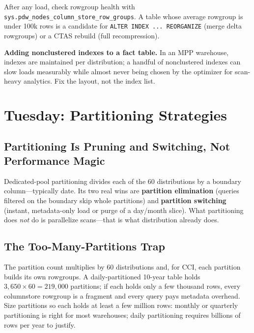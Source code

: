 \begin{tipbox}
After any load, check rowgroup health with \texttt{sys.pdw\_nodes\_column\_store\_row\_groups}. A table whose average rowgroup is under 100k rows is a candidate for \texttt{ALTER INDEX ... REORGANIZE} (merge delta rowgroups) or a CTAS rebuild (full recompression).
\end{tipbox}

\begin{pitfall}
\textbf{Adding nonclustered indexes to a fact table.} In an MPP warehouse, indexes are maintained per distribution; a handful of nonclustered indexes can slow loads measurably while almost never being chosen by the optimizer for scan-heavy analytics. Fix the layout, not the index list.
\end{pitfall}

\section{Tuesday: Partitioning Strategies}

\subsection{Partitioning Is Pruning and Switching, Not Performance Magic}
Dedicated-pool partitioning divides each of the 60 distributions by a boundary column---typically date. Its two real wins are \textbf{partition elimination} (queries filtered on the boundary skip whole partitions) and \textbf{partition switching} (instant, metadata-only load or purge of a day/month slice). What partitioning does \emph{not} do is parallelize scans---that is what distribution already does.

\subsection{The Too-Many-Partitions Trap}
The partition count multiplies by 60 distributions and, for CCI, each partition builds its own rowgroups. A daily-partitioned 10-year table holds $3{,}650 \times 60 = 219{,}000$ partitions; if each holds only a few thousand rows, every columnstore rowgroup is a fragment and every query pays metadata overhead. Size partitions so each holds at least a few million rows: monthly or quarterly partitioning is right for most warehouses; daily partitioning requires billions of rows per year to justify.

